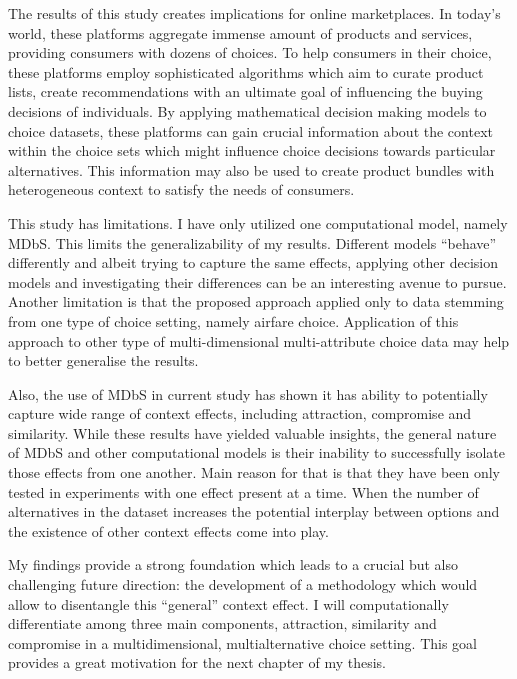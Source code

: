 \documentclass[a4paper,12pt]{article}
\begin{document}
The results of this study creates implications for online marketplaces. In today's world, these platforms aggregate immense amount of products and services, providing consumers with dozens of choices. To help consumers in their choice, these platforms employ sophisticated algorithms which aim to curate product lists, create recommendations with an ultimate goal of influencing the buying decisions of individuals. By applying mathematical decision making models to choice datasets, these platforms can gain crucial information about the context within the choice sets which might influence choice decisions towards particular alternatives. This information may also be used to create product bundles with heterogeneous context to satisfy the needs of consumers.

This study has limitations. I have only utilized one computational model, namely MDbS. This limits the generalizability of my results. Different models ``behave'' differently and albeit trying to capture the same effects, applying other decision models and investigating their differences can be an interesting avenue to pursue. Another limitation is that the proposed approach applied only to data stemming from one type of choice setting, namely airfare choice. Application of this approach to other type of multi-dimensional multi-attribute choice data may help to better generalise the results.

Also, the use of MDbS in current study has shown it has ability to potentially capture wide range of context effects, including attraction, compromise and similarity. While these results have yielded valuable insights, the general nature of MDbS and other computational models is their inability to successfully isolate those effects from one another. Main reason for that is that they have been only tested in experiments with one effect present at a time. When the number of alternatives in the dataset increases the potential interplay between options and the existence of other context effects come into play. 

My findings provide a strong foundation which leads to a crucial but also challenging future direction: the development of a methodology which would allow to disentangle this ``general'' context effect. I will computationally differentiate among three main components, attraction, similarity and compromise in a multidimensional, multialternative choice setting. This goal provides a great motivation for the next chapter of my thesis.

\newpage
\end{document}
